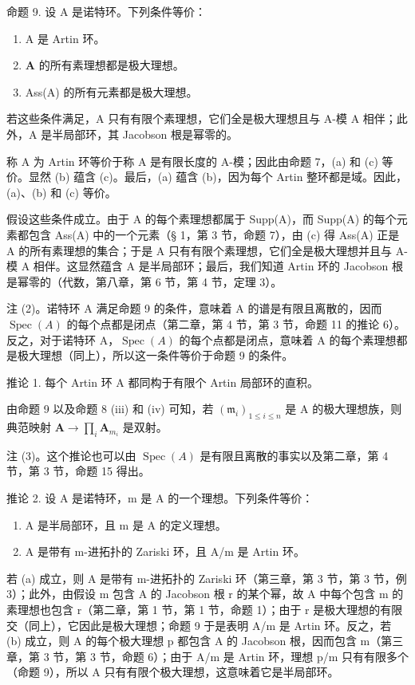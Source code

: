命题 9. 设 A 是诺特环。下列条件等价：

\begin{enumerate}
\def\labelenumi{(\alph{enumi})}
\item
  A 是 Artin 环。
\item
  \(\mathbf{A}\) 的所有素理想都是极大理想。
\item
  Ass(A) 的所有元素都是极大理想。
\end{enumerate}

若这些条件满足，A 只有有限个素理想，它们全是极大理想且与 A-模 A 相伴；此外，A 是半局部环，其 Jacobson 根是幂零的。

称 A 为 Artin 环等价于称 A 是有限长度的 A-模；因此由命题 7，(a) 和 (c) 等价。显然 (b) 蕴含 (c)。最后，(a) 蕴含 (b)，因为每个 Artin 整环都是域。因此，(a)、(b) 和 (c) 等价。

假设这些条件成立。由于 A 的每个素理想都属于 Supp(A)，而 Supp(A) 的每个元素都包含 Ass(A) 中的一个元素（§ 1，第 3 节，命题 7），由 (c) 得 Ass(A) 正是 A 的所有素理想的集合；于是 A 只有有限个素理想，它们全是极大理想并且与 A-模 A 相伴。这显然蕴含 A 是半局部环；最后，我们知道 Artin 环的 Jacobson 根是幂零的（代数，第八章，第 6 节，第 4 节，定理 3）。

注 (2)。诺特环 A 满足命题 9 的条件，意味着 A 的谱是有限且离散的，因而 \(\operatorname{Spec}(A)\) 的每个点都是闭点（第二章，第 4 节，第 3 节，命题 11 的推论 6）。反之，对于诺特环 A，\(\operatorname{Spec}(A)\) 的每个点都是闭点，意味着 A 的每个素理想都是极大理想（同上），所以这一条件等价于命题 9 的条件。

推论 1. 每个 Artin 环 A 都同构于有限个 Artin 局部环的直积。

由命题 9 以及命题 8 (iii) 和 (iv) 可知，若 \((\mathfrak{m}_i)_{1\leqslant i\leqslant n}\) 是 A 的极大理想族，则典范映射 \(\mathbf{A}\to \prod_{i}\mathbf{A}_{m_i}\) 是双射。

注 (3)。这个推论也可以由 \(\operatorname{Spec}(A)\) 是有限且离散的事实以及第二章，第 4 节，第 3 节，命题 15 得出。

推论 2. 设 A 是诺特环，m 是 A 的一个理想。下列条件等价：

\begin{enumerate}
\def\labelenumi{(\alph{enumi})}
\item
  A 是半局部环，且 m 是 A 的定义理想。
\item
  A 是带有 m-进拓扑的 Zariski 环，且 A/m 是 Artin 环。
\end{enumerate}

若 (a) 成立，则 A 是带有 m-进拓扑的 Zariski 环（第三章，第 3 节，第 3 节，例 3）；此外，由假设 m 包含 A 的 Jacobson 根 r 的某个幂，故 A 中每个包含 m 的素理想也包含 r（第二章，第 1 节，第 1 节，命题 1）；由于 r 是极大理想的有限交（同上），它因此是极大理想；命题 9 于是表明 A/m 是 Artin 环。反之，若 (b) 成立，则 A 的每个极大理想 p 都包含 A 的 Jacobson 根，因而包含 m（第三章，第 3 节，第 3 节，命题 6）；由于 A/m 是 Artin 环，理想 p/m 只有有限多个（命题 9），所以 A 只有有限个极大理想，这意味着它是半局部环。

